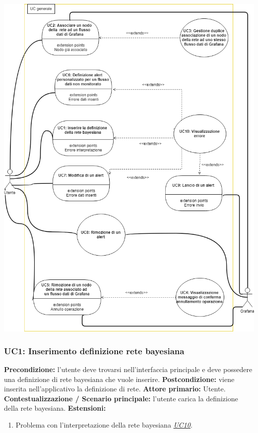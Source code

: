 		\includegraphics[width=\textwidth]{UC.png}
		
				\subsubsection{UC1: Inserimento definizione rete bayesiana}
                    \textbf{Precondizione:} l’utente deve trovarsi nell’interfaccia principale e deve possedere una definizione di rete bayesiana che vuole inserire.
                    \newline
                    \textbf{Postcondizione:} viene inserita nell’applicativo la definizione di rete.
                    \newline
                    \textbf{Attore primario:} Utente.
                    \newline
                    \textbf{Contestualizzazione / Scenario principale:} l’utente carica la definizione della rete bayesiana.
                    \newline
                    \textbf{Estensioni:} \begin{enumerate}
                            \item Problema con l’interpretazione della rete bayesiana \underline{\textit{UC10}}.
                        \end{enumerate}
                        

